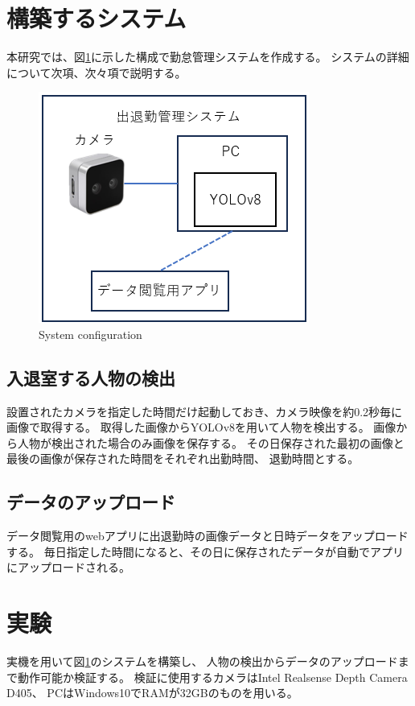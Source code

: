 \documentclass[10pt]{jarticle}
\begin{document}
    \section{構築するシステム}%
本研究では、図\ref{configuration}に示した構成で勤怠管理システムを作成する。
システムの詳細について次項、次々項で説明する。

\begin{figure}[!h]
\centering
\includegraphics[width=0.8\linewidth]{fig/composition.png}
\caption{System configuration}
\label{configuration}
\end{figure}

    \subsection{入退室する人物の検出}
設置されたカメラを指定した時間だけ起動しておき、カメラ映像を約0.2秒毎に画像で取得する。
取得した画像からYOLOv8を用いて人物を検出する。
画像から人物が検出された場合のみ画像を保存する。
その日保存された最初の画像と最後の画像が保存された時間をそれぞれ出勤時間、
退勤時間とする。

    \subsection{データのアップロード}
データ閲覧用のwebアプリに出退勤時の画像データと日時データをアップロードする。
毎日指定した時間になると、その日に保存されたデータが自動でアプリにアップロードされる。


     
    \section{実験}%
実機を用いて図\ref{configuration}のシステムを構築し、
人物の検出からデータのアップロードまで動作可能か検証する。
検証に使用するカメラはIntel Realsense Depth Camera D405\cite{camera}、
PCはWindows10でRAMが32GBのものを用いる。
\end{document}
